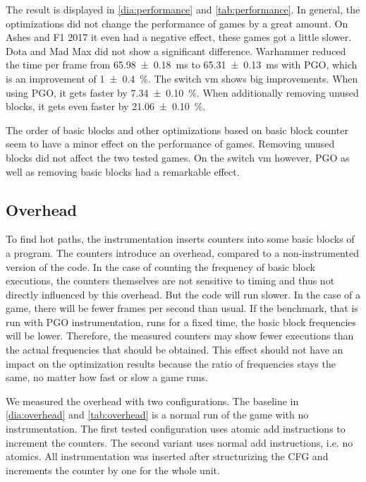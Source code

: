 \begin{table}
	\centering
	\label{tab:performance}
\end{table}

The result is displayed in \cref{dia:performance} and \cref{tab:performance}.
In general, the optimizations did not change the performance of games by a great amount.
On Ashes and F1 2017 it even had a negative effect, these games got a little slower.
Dota and Mad Max did not show a significant difference.
Warhammer reduced the time per frame from \SI{65.98 \pm 0.18}{\milli\second} to \SI{65.31 \pm 0.13}{\milli\second} with PGO, which is an improvement of \SI{1 \pm 0.4}{\percent}.
The switch vm shows big improvements. When using PGO, it gets faster by \SI{7.34 \pm 0.10}{\percent}.
When additionally removing unused blocks, it gets even faster by \SI{21.06 \pm 0.10}{\percent}.

The order of basic blocks and other optimizations based on basic block counter seem to have a minor effect on the performance of games.
Removing unused blocks did not affect the two tested games.
On the switch vm however, PGO as well as removing basic blocks had a remarkable effect.

\subsection{Overhead}
\label{sub:overhead}
To find hot paths, the instrumentation inserts counters into some basic blocks of a program. The counters introduce an overhead, compared to a non-instrumented version of the code.
In the case of counting the frequency of basic block executions, the counters themselves are not sensitive to timing and thus not directly influenced by this overhead.
But the code will run slower. In the case of a game, there will be fewer frames per second than usual.
If the benchmark, that is run with PGO instrumentation, runs for a fixed time, the basic block frequencies will be lower.
Therefore, the measured counters may show fewer executions than the actual frequencies that should be obtained.
This effect should not have an impact on the optimization results because the ratio of frequencies stays the same, no matter how fast or slow a game runs.

We measured the overhead with two configurations.
The baseline in \cref{dia:overhead} and \cref{tab:overhead} is a normal run of the game with no instrumentation.
The first tested configuration uses atomic add instructions to increment the counters.
The second variant uses normal add instructions, i.e. no atomics.
All instrumentation was inserted after structurizing the CFG and increments the counter by one for the whole unit.


